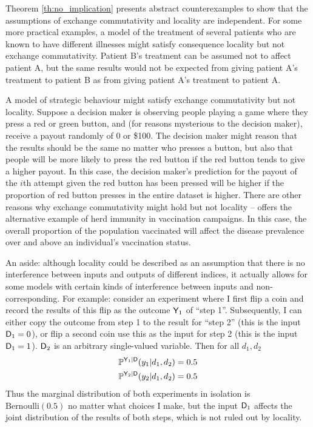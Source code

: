Theorem \ref{th:no_implication} presents abstract counterexamples to show that the assumptions of exchange commutativity and locality are independent. For some more practical examples, a model of the treatment of several patients who are known to have different illnesses might satisfy consequence locality but not exchange commutativity. Patient B's treatment can be assumed not to affect patient A, but the same results would not be expected from giving patient A's treatment to patient B as from giving patient A's treatment to patient A.

A model of strategic behaviour might satisfy exchange commutativity but not locality. Suppose a decision maker is observing people playing a game where they press a red or green button, and (for reasons mysterious to the decision maker), receive a payout randomly of 0 or \$100. The decision maker might reason that the results should be the same no matter who presses a button, but also that people will be more likely to press the red button if the red button tends to give a higher payout. In this case, the decision maker's prediction for the payout of the $i$th attempt given the red button has been pressed will be higher if the proportion of red button presses in the entire dataset is higher. There are other reasons why exchange commutativity might hold but not locality -- \citet{dawid_causal_2000} offers the alternative example of herd immunity in vaccination campaigns. In this case, the overall proportion of the population vaccinated will affect the disease prevalence over and above an individual's vaccination status.

An aside: although locality could be described as an assumption that there is no interference between inputs and outputs of different indices, it actually allows for some models with certain kinds of interference between inputs and non-corresponding. For example: consider an experiment where I first flip a coin and record the results of this flip as the outcome $\mathsf{Y}_1$ of ``step 1''. Subsequently, I can either copy the outcome from step 1 to the result for ``step 2'' (this is the input $\mathsf{D}_1=0$), or flip a second coin use this as the input for step 2 (this is the input $\mathsf{D}_1=1$). $\mathsf{D}_2$ is an arbitrary single-valued variable. Then for all $d_1, d_2$
\begin{align}
    \mathbb{P}^{\mathsf{Y}_1|\mathsf{D}}(y_1|d_1,d_2) &= 0.5\\
    \mathbb{P}^{\mathsf{Y}_2|\mathsf{D}}(y_2|d_1,d_2) &= 0.5
\end{align}
Thus the marginal distribution of both experiments in isolation is $\text{Bernoulli}(0.5)$ no matter what choices I make, but the input $\mathsf{D}_1$ affects the joint distribution of the results of both steps, which is not ruled out by locality.

